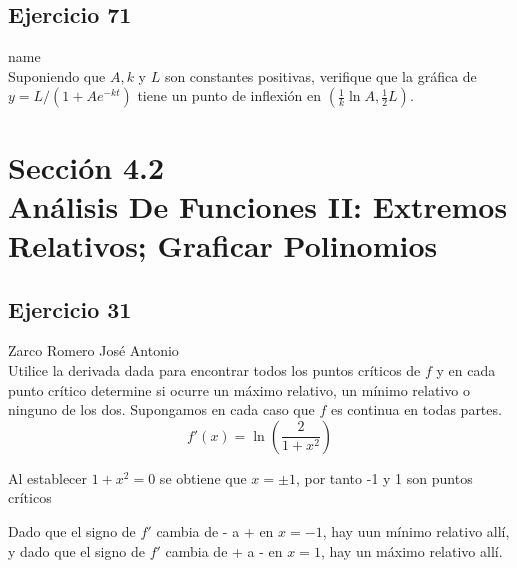 \documentclass[12pt]{article}
\begin{document}
\subsection{Ejercicio 71} name \\

Suponiendo que $A, k$ y $L$ son constantes positivas, verifique que la gráfica de $y=L/(1+Ae^{-kt})$ tiene un punto de inflexión en $\left( \frac{1}{k}\ln{A},\frac{1}{2}L \right)$.


\section{Sección 4.2 \\ Análisis De Funciones II: Extremos Relativos; Graficar Polinomios} 
\subsection{Ejercicio 31} Zarco Romero José Antonio \\

Utilice la derivada dada para encontrar todos los puntos críticos de $f$ y en cada punto crítico determine si ocurre un máximo relativo, un mínimo relativo o ninguno de los dos. Supongamos en cada caso que $f$ es continua en todas partes.
\[
f'(x)=\ln{\left( \frac{2}{1+x^2} \right)}
\]

Al establecer $1+x^2=0$ se obtiene que $x=\pm 1$, por tanto -1 y 1 son puntos críticos
  \begin{table}[H]
    \centering
    \begin{tabular}{c|c|c}
      \hline
      Intervalo & $f'(x) = \ln{\left( \frac{2}{1+x^2} \right)$ & Conclusión \\
      \hline
      $(-\infty,-1)$ & - & $f$ es decreciente \\
      $(-1,1)$ & + & $f$ es creciente\\
      $(1,+\infty)$ & - & $f$ es decreciente\\
      \hline
    \end{tabular}
  \end{table}
  Dado que el signo de $f'$ cambia de - a + en $x=-1$, hay uun mínimo relativo allí, y
  dado que el signo de $f'$ cambia de + a - en $x=1$, hay un máximo relativo allí.
\end{document}

